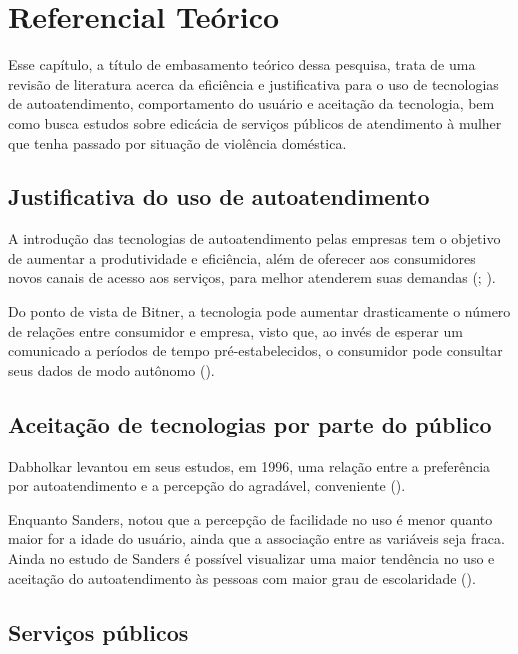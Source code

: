 \section{Referencial Teórico}
\vspace*{1cm}
Esse capítulo, a título de embasamento teórico dessa pesquisa, trata de uma revisão de literatura acerca da eficiência e justificativa para o uso de tecnologias de autoatendimento, comportamento do usuário e aceitação da tecnologia, bem como busca estudos sobre edicácia de serviços públicos de atendimento à mulher que tenha passado por situação de violência doméstica.
\subsection{Justificativa do uso de autoatendimento}
A introdução das tecnologias de autoatendimento pelas empresas tem o objetivo de aumentar a produtividade e eficiência, além de oferecer aos consumidores novos canais de acesso aos serviços, para melhor atenderem suas demandas (\cite{autoatendimento-em-aeroportos}; \cite{walker-service-delivery}).

Do ponto de vista de Bitner, a tecnologia pode aumentar drasticamente o número de relações entre consumidor e empresa, visto que, ao invés de esperar um comunicado a períodos de tempo pré-estabelecidos, o consumidor pode consultar seus dados de modo autônomo (\cite{bitner-service-encounters}).
\subsection{Aceitação de tecnologias por parte do público}
Dabholkar levantou em seus estudos, em 1996, uma relação entre a preferência por autoatendimento e a percepção do agradável, conveniente (\cite{dabholkar-service-encounters}).

Enquanto Sanders, notou que a percepção de facilidade no uso é menor quanto maior for a idade do usuário, ainda que a associação entre as variáveis seja fraca. Ainda no estudo de Sanders é possível visualizar uma maior tendência no uso e aceitação do autoatendimento às pessoas com maior grau de escolaridade (\cite{autoatendimento-em-aeroportos}).
\subsection{Serviços públicos}

\newpage

